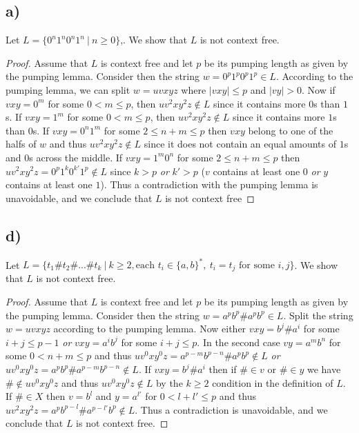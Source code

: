 \documentclass[a4paper,11pt]{article}
\newcommand{\abs}[1]{\left\lvert #1 \right\rvert}
\numberwithin{equation}{section}
\begin{document}
	\subsection*{a)}
	Let $ L=\{0^n1^n0^n1^n\ \vert\ n\geq0 \} $,. We show that $ L $ is not context free.
	\begin{proof}
		Assume that $ L $ is context free and let $ p $ be its pumping length as given by the pumping lemma. Consider then the string $ w=0^p1^p0^p1^p\in L $. According to the pumping lemma, we can split $ w=uvxyz $ where $ \abs{vxy}\leq p $ and $ \abs{vy}>0 $. Now if $ vxy=0^m $ for some $ 0<m\leq p $, then $ uv^2xy^2z\notin L $ since it contains more $ 0 $s than $ 1 $s. If $ vxy=1^m $ for some $ 0<m\leq p $, then $ uv^2xy^2z\notin L $ since it contains more $ 1 $s than $ 0 $s. If $ vxy=0^n1^m $ for some $ 2\leq n+m\leq p $ then $ vxy $ belong to one of the halfs of $ w $ and thus $ uv^2xy^2z\notin L $ since it does not contain an equal amounts of $ 1 $s and $ 0 $s across the middle. If $ vxy=1^m0^n $ for some $ 2\leq n+m\leq p $ then $ uv^2xy^2z=0^p1^k0^{k'}1^p\notin L $ since $ k>p$ \emph{or} $k'>p $ ($ v $ contains at least one $ 0 $ \emph{or} $ y $ contains at least one $ 1 $). Thus a contradiction with the pumping lemma is unavoidable, and we conclude that $ L$ is not context free
	\end{proof}
	\subsection*{d)}
	Let $ L=\{t_1\#t_2\#...\#t_k\ \vert\ k\geq2, \text{each }t_i\in\{a,b\}^\ast,\ t_i=t_j\text{ for some }i,j\} $. We show that $ L $ is not context free.
	\begin{proof}
		Assume that $ L $ is context free and let $ p $ be its pumping length as given by the pumping lemma. Consider then the string $ w=a^pb^p\#a^pb^p\in L $. Split the string $ w=uvxyz $ according to the pumping lemma. Now either $ vxy=b^j\#a^i $ for some $ i+j\leq p-1 $ \emph{or} $ vxy=a^ib^j $ for some $ i+j\leq p $. In the second case $ vy=a^mb^n $ for some $ 0<n+m\leq p $ and thus $ uv^0xy^0z=a^{p-m}b^{p-n}\#a^pb^p\notin L $ \emph{or} $ uv^0xy^0z=a^pb^p\#a^{p-m}b^{p-n}\notin L $. If $ vxy=b^j\#a^i $ then if $ \#\in v $ or $ \#\in y $ we have $ \#\notin uv^0xy^0z $ and thus $ uv^0xy^0z\notin L $ by the $ k\geq2 $ condition in the definition of $ L $. If $ \#\in X $ then $ v=b^l $ and $ y=a^{l'} $ for $ 0<l+l'\leq p $ and thus $ uv^2xy^2z=a^pb^{p-l}\#a^{p-l'}b^p\notin L $. Thus a contradiction is unavoidable, and we conclude that $ L $ is not context free.
	\end{proof}
	
\end{document}
